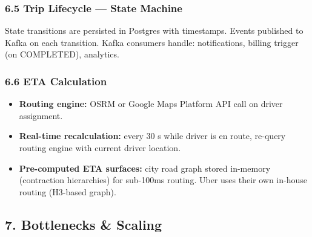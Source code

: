 \documentclass[11pt]{article}
\providecommand{\tightlist}{\setlength{\itemsep}{1pt}\setlength{\parskip}{0pt}}
\begin{document}
\subsubsection{6.5 Trip Lifecycle --- State Machine}\label{65-trip-lifecycle--state-machine}


State transitions are persisted in Postgres with timestamps. Events published to Kafka on each transition. Kafka consumers handle: notifications, billing trigger (on COMPLETED), analytics.

\subsubsection{6.6 ETA Calculation}\label{66-eta-calculation}

\begin{itemize}
\tightlist
\item
  \textbf{Routing engine:} OSRM or Google Maps Platform API call on driver assignment.
\item
  \textbf{Real-time recalculation:} every 30 s while driver is en route, re-query routing engine with current driver location.
\item
  \textbf{Pre-computed ETA surfaces:} city road graph stored in-memory (contraction hierarchies) for sub-100ms routing. Uber uses their own in-house routing (H3-based graph).
\end{itemize}

\subsection{7. Bottlenecks \& Scaling}\label{7-bottlenecks--scaling-1}
\end{document}
